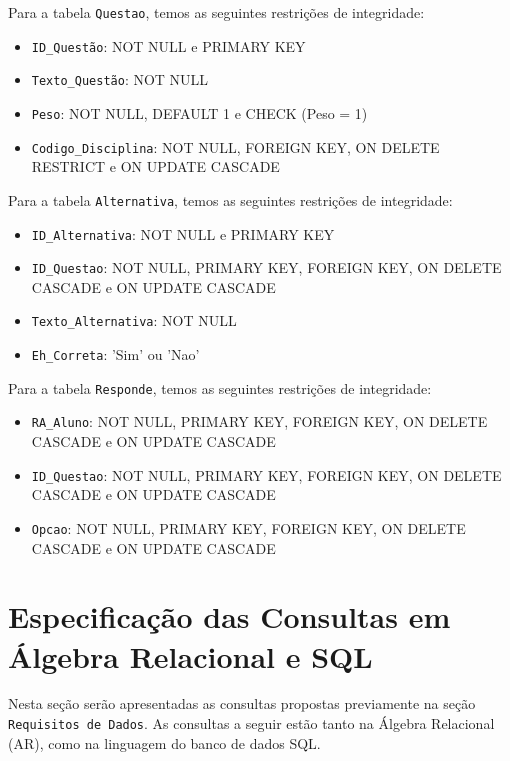 \documentclass[12pt,a4paper]{article}
\begin{document}
\vspace{0.5cm}
Para a tabela \texttt{Questao}, temos as seguintes restrições de integridade:

\begin{itemize}
    \item \texttt{ID\_Questão}: NOT NULL e PRIMARY KEY
    \item \texttt{Texto\_Questão}: NOT NULL
    \item \texttt{Peso}: NOT NULL, DEFAULT 1 e CHECK (Peso = 1)
    \item \texttt{Codigo\_Disciplina}: NOT NULL, FOREIGN KEY, ON DELETE RESTRICT e ON UPDATE CASCADE
\end{itemize}

\vspace{0.5cm}
Para a tabela \texttt{Alternativa}, temos as seguintes restrições de integridade:

\begin{itemize}
    \item \texttt{ID\_Alternativa}: NOT NULL e PRIMARY KEY
    \item \texttt{ID\_Questao}: NOT NULL, PRIMARY KEY, FOREIGN KEY, ON DELETE CASCADE e ON UPDATE CASCADE
    \item \texttt{Texto\_Alternativa}: NOT NULL
    \item \texttt{Eh\_Correta}: 'Sim' ou 'Nao'
\end{itemize}

\vspace{0.5cm}
Para a tabela \texttt{Responde}, temos as seguintes restrições de integridade:

\begin{itemize}
    \item \texttt{RA\_Aluno}: NOT NULL, PRIMARY KEY, FOREIGN KEY, ON DELETE CASCADE e ON UPDATE CASCADE
    \item \texttt{ID\_Questao}: NOT NULL, PRIMARY KEY, FOREIGN KEY, ON DELETE CASCADE e ON UPDATE CASCADE
    \item \texttt{Opcao}: NOT NULL, PRIMARY KEY, FOREIGN KEY, ON DELETE CASCADE e ON UPDATE CASCADE
\end{itemize}
\vspace{0.5cm}
\section{Especificação das Consultas em Álgebra Relacional e SQL}
Nesta seção serão apresentadas as consultas propostas previamente na seção \texttt{Requisitos de Dados}. As consultas a seguir estão tanto na Álgebra Relacional (AR), como na linguagem do banco de dados SQL.
\vspace{0.5cm}
\end{document}
